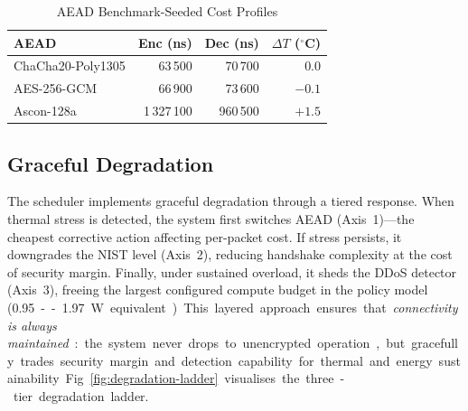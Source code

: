 \documentclass[conference]{IEEEtran}
\begin{document}
\begin{table}[t]
\centering
\caption{AEAD Benchmark-Seeded Cost Profiles\protect\footnotemark}
\label{tab:aead-seed}
\small
\begin{tabular}{@{}lrrr@{}}
\toprule
\textbf{AEAD} & \textbf{Enc (ns)} & \textbf{Dec (ns)} & $\Delta T$ ($^\circ$C) \\
\midrule
ChaCha20-Poly1305 & 63\,500 & 70\,700 & 0.0 \\
AES-256-GCM & 66\,900 & 73\,600 & $-0.1$ \\
Ascon-128a & 1\,327\,100 & 960\,500 & $+1.5$ \\
\bottomrule
\end{tabular}
\end{table}

\subsection{Graceful Degradation}

The scheduler implements graceful degradation through a tiered response.
When thermal stress is detected, the system first switches AEAD (Axis~1)---the cheapest corrective action affecting per-packet cost.
If stress persists, it downgrades the NIST level (Axis~2), reducing handshake complexity at the cost of security margin.
Finally, under sustained overload, it sheds the DDoS detector (Axis~3), freeing the largest configured compute budget in the policy model (\SI{0.95}--\SI{1.97}{\watt} equivalent).

This layered approach ensures that \emph{connectivity is always maintained}: the system never drops to unencrypted operation, but gracefully trades security margin and detection capability for thermal and energy sustainability.

Fig.~\ref{fig:degradation-ladder} visualises the three-tier degradation ladder.
\end{document}
